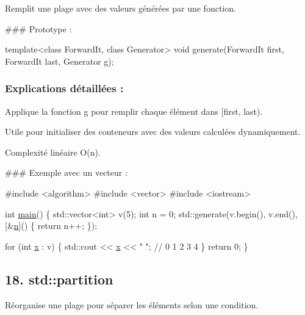 Remplit une plage avec des valeurs générées par une fonction.

\#\#\# Prototype \+: 
\begin{DoxyCode}
\textcolor{keyword}{template}<\textcolor{keyword}{class} ForwardIt, \textcolor{keyword}{class} Generator>
\textcolor{keywordtype}{void} generate(ForwardIt first, ForwardIt last, Generator g);
\end{DoxyCode}


\subsubsection*{Explications détaillées \+:}


\begin{DoxyItemize}
\item Applique la fonction {\ttfamily g} pour remplir chaque élément dans {\ttfamily \mbox{[}first, last)}.
\item Utile pour initialiser des conteneurs avec des valeurs calculées dynamiquement.
\item Complexité linéaire O(n).
\end{DoxyItemize}

\#\#\# Exemple avec un vecteur \+: 
\begin{DoxyCode}
\textcolor{preprocessor}{#include <algorithm>}
\textcolor{preprocessor}{#include <vector>}
\textcolor{preprocessor}{#include <iostream>}

\textcolor{keywordtype}{int} \hyperlink{htop_8c_a3c04138a5bfe5d72780bb7e82a18e627}{main}() \{
    std::vector<int> v(5);
    \textcolor{keywordtype}{int} n = 0;
    std::generate(v.begin(), v.end(), [&\hyperlink{exo21_8cpp_a76f11d9a0a47b94f72c2d0e77fb32240}{n}]() \{ \textcolor{keywordflow}{return} n++; \});

    \textcolor{keywordflow}{for} (\textcolor{keywordtype}{int} \hyperlink{addition_8c_a6150e0515f7202e2fb518f7206ed97dc}{x} : v) \{
        std::cout << \hyperlink{addition_8c_a6150e0515f7202e2fb518f7206ed97dc}{x} << \textcolor{stringliteral}{" "}; \textcolor{comment}{// 0 1 2 3 4}
    \}
    \textcolor{keywordflow}{return} 0;
\}
\end{DoxyCode}
 



\subsection*{18. {\bfseries std\+::partition}}

Réorganise une plage pour séparer les éléments selon une condition.

